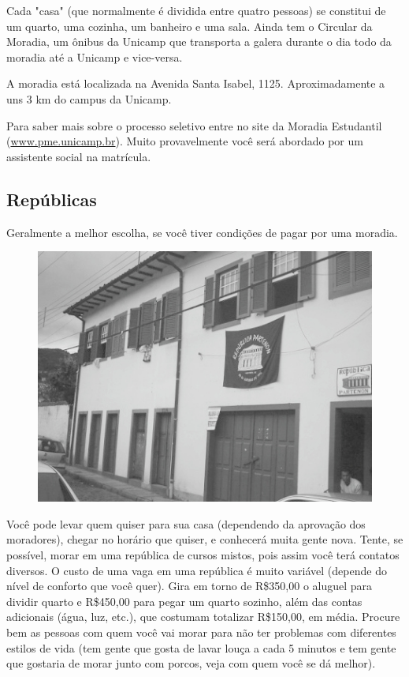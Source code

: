 Cada "casa" (que normalmente é dividida entre quatro pessoas) se constitui de um
quarto, uma cozinha, um banheiro e uma sala. Ainda tem o Circular da Moradia, um
ônibus da Unicamp que transporta a galera durante o dia todo da moradia até
a Unicamp e vice-versa.

A moradia está localizada na Avenida Santa Isabel, 1125. Aproximadamente a uns
3 km do campus da Unicamp.

Para saber mais sobre o processo seletivo entre no site da Moradia Estudantil
(\url{www.pme.unicamp.br}). Muito provavelmente você
será abordado por um assistente social na matrícula.

\subsection{Repúblicas}

Geralmente a melhor escolha, se você tiver condições de pagar por uma moradia.
\begin{figure}[h!]
    \vspace{-10pt}
    \centering
    \includegraphics[scale=0.58,keepaspectratio=true]{img/imgs/5-moradia/-034.jpg}
    \vspace{-10pt}
\end{figure}
Você pode levar quem quiser para sua casa (dependendo da aprovação dos
moradores), chegar no horário que quiser, e conhecerá muita gente nova. Tente,
se possível, morar em uma república de cursos mistos, pois assim você terá
contatos diversos. O custo de uma vaga em uma república é muito variável
(depende do nível de conforto que você quer). Gira em torno de
R\$350,00 o aluguel para dividir quarto e R\$450,00 para pegar
um quarto sozinho, além das contas adicionais (água, luz, etc.), que costumam
totalizar R\$150,00, em média. Procure bem as pessoas com quem você vai morar para não ter
problemas com diferentes estilos de vida (tem gente que gosta de lavar louça
a cada 5 minutos e tem gente que gostaria de morar junto com porcos, veja com
quem você se dá melhor).

